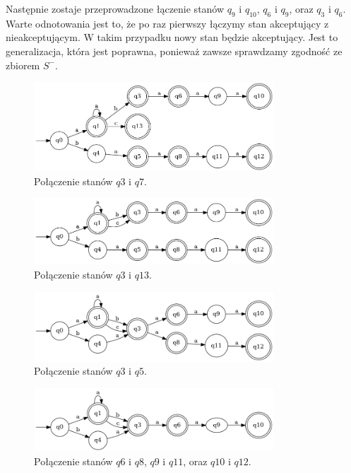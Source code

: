 Następnie zostaje przeprowadzone łączenie stanów \( q_9 \) i \( q_{10} \), \( q_6 \) i \( q_9 \), oraz \( q_3 \) i \( q_6 \). Warte odnotowania jest to, że po raz pierwszy łączymy stan akceptujący z nieakceptującym. W takim przypadku nowy stan będzie akceptujący. Jest to generalizacja, która jest poprawna, ponieważ zawsze sprawdzamy zgodność ze zbiorem \( S^- \).

\begin{figure}[ht]
    \centering
    \includegraphics[width=0.8\textwidth]{images/pta02.png}
    \caption{Połączenie stanów \( q3 \) i \( q7 \).}
    \label{fig:pta02}
\end{figure}

\begin{figure}[ht]
    \centering
    \includegraphics[width=0.8\textwidth]{images/pta03.png}
    \caption{Połączenie stanów \( q3 \) i \( q13 \).}
    \label{fig:pta03}
\end{figure}

\begin{figure}[ht]
    \centering
    \includegraphics[width=0.8\textwidth]{images/pta04.png}
    \caption{Połączenie stanów \( q3 \) i \( q5 \).}
    \label{fig:pta04}
\end{figure}

\begin{figure}[ht]
    \centering
    \includegraphics[width=0.8\textwidth]{images/pta05.png}
    \caption{Połączenie stanów \( q6 \) i \( q8 \), \( q9 \) i \( q11 \), oraz \( q10 \) i \( q12 \).}
    \label{fig:pta05}
\end{figure}

